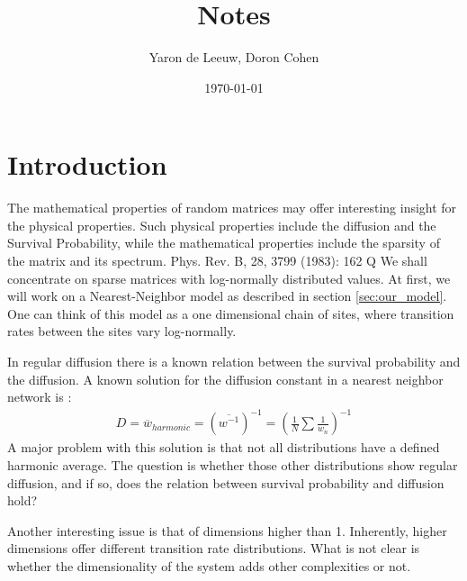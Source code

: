 \documentclass[onecolumn,fleqn]{revtex4}
\begin{document}
\title{Notes}

\author{Yaron de Leeuw, Doron Cohen}
\date{\today}
\maketitle



\section{Introduction}
The mathematical properties of random matrices may offer interesting insight for the physical properties. Such physical properties include the diffusion and the Survival Probability, while the mathematical properties include the sparsity of the matrix and its spectrum. 
Phys. Rev. B, 28, 3799 (1983): 162 Q
We shall concentrate on sparse matrices with log-normally distributed values. At first, we will work on a Nearest-Neighbor model as described in section \ref{sec:our_model}. One can think of this model as a one dimensional chain of sites, where transition rates between the sites vary log-normally.

In regular diffusion there is a known relation between the survival probability and the diffusion. 
A known solution for the diffusion constant in a nearest neighbor network is \cite{Derrida:1983}:
\begin{align}
D=\overline{w}_{harmonic} =(\overline{w^{-1}})^{-1}=\left(\frac{1}{N}\sum\frac{1}{w_n}\right)^{-1}
\end{align}
A major problem with this solution is that not all distributions have a defined harmonic average. The question is whether those other distributions show regular diffusion, and if so, does the relation between survival probability and diffusion hold?


Another interesting issue is that of dimensions higher than 1. Inherently, higher dimensions offer different transition rate distributions. What is not clear is whether the dimensionality of the system adds other complexities or not. 
\end{document}
